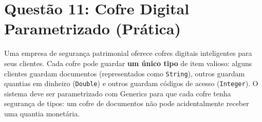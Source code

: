 \documentclass[12pt, a4paper]{article}
\begin{document}
\vspace{0.2cm}

\section*{Questão 11: Cofre Digital Parametrizado (Prática)}
Uma empresa de segurança patrimonial oferece cofres digitais inteligentes para seus clientes. Cada cofre pode guardar \textbf{um único tipo} de item valioso: alguns clientes guardam documentos (representados como \texttt{String}), outros guardam quantias em dinheiro (\texttt{Double}) e outros guardam códigos de acesso (\texttt{Integer}). O sistema deve ser parametrizado com Generics para que cada cofre tenha segurança de tipos: um cofre de documentos não pode acidentalmente receber uma quantia monetária.
\end{document}
